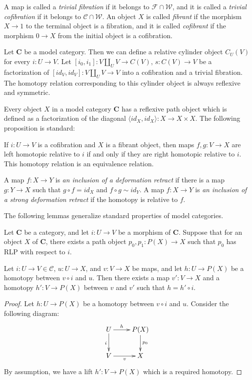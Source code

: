 \documentclass{tac}
\theoremstyle{definition}
\newcommand{\we}{\mathcal{W}}
\newcommand{\fib}{\mathcal{F}}
\newcommand{\cof}{\mathcal{C}}
\newcommand{\cat}[1]{\mathbf{#1}}
\newcommand{\C}{\cat{C}}
\newcommand{\cyli}{i}
\begin{document}
A map is called a \emph{trivial fibration} if it belongs to $\fib \cap \we$,
and it is called a \emph{trivial cofibration} if it belongs to $\cof \cap \we$.
An object $X$ is called \emph{fibrant} if the morphism $X \to 1$ to the terminal object is a fibration,
and it is called \emph{cofibrant} if the morphism $0 \to X$ from the initial object is a cofibration.

Let $\C$ be a model category.
Then we can define a relative cylinder object $C_U(V)$ for every $i : U \to V$.
Let $[\cyli_0,\cyli_1] : V \amalg_U V \to C(V)$, $s : C(V) \to V$ be a factorization of $[id_V,id_V] : V \amalg_U V \to V$ into a cofibration and a trivial fibration.
The homotopy relation corresponding to this cylinder object is always reflexive and symmetric.

Every object $X$ in a model category $\C$ has a reflexive path object which is defined as a factorization of the diagonal $\langle id_X, id_X \rangle : X \to X \times X$.
The following proposition is standard:
\begin{prop}
If $i : U \to V$ is a cofibration and $X$ is a fibrant object, then maps $f,g : V \to X$ are left homotopic relative to $i$ if and only if they are right homotopic relative to $i$.
This homotopy relation is an equivalence relation.
\end{prop}

A map $f : X \to Y$ is \emph{an inclusion of a deformation retract} if there is
a map $g : Y \to X$ such that $g \circ f = id_X$ and $f \circ g \sim id_Y$.
A map $f : X \to Y$ is \emph{an inclusion of a strong deformation retract} if the homotopy is relative to $f$.

The following lemmas generalize standard properties of model categories.

\begin{lem}
Let $\C$ be a category, and let $i : U \to V$ be a morphism of $\C$.
Suppose that for an object $X$ of $\C$, there exists a path object $p_0,p_1 : P(X) \to X$ such that $p_0$ has RLP with respect to $i$.

Let $i : U \to V \in \cof$, $u : U \to X$, and $v : V \to X$ be maps, and let $h : U \to P(X)$ be a homotopy between $v \circ i$ and $u$.
Then there exists a map $v' : V \to X$ and a homotopy $h' : V \to P(X)$ between $v$ and $v'$ such that $h = h' \circ i$.
\end{lem}
\begin{proof}
Let $h : U \to P(X)$ be a homotopy between $v \circ i$ and $u$.
Consider the following diagram:
\[ \xymatrix{ U \ar[r]^-h \ar[d]_i & P(X) \ar[d]^{p_0} \\
              V \ar[r]_v & X
            } \]
By assumption, we have a lift $h' : V \to P(X)$ which is a required homotopy.
\end{proof}
\end{document}
